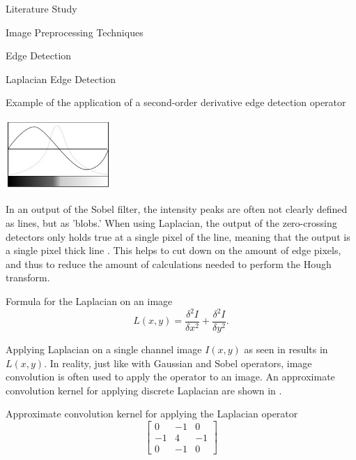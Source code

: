 \documentclass{matthijs}
\begin{document}
\begin{hoofdstuk}{Literature Study}
\begin{paragraaf}{Image Preprocessing Techniques}
\begin{subparagraaf}{Edge Detection}
\begin{subsubparagraaf}{Laplacian Edge Detection}
					\begin{figuur}{Example of the application of a second-order derivative edge detection operator}

						\includegraphics[width=0.3\textwidth]{sinha2017sobel-img3.jpg}
						\cite{sinha2017sobel}

					\end{figuur}

					In an output of the Sobel filter, the intensity peaks are often not clearly defined as lines, but as 'blobs.'
					When using Laplacian, the output of the zero-crossing detectors only holds true at a single pixel of the line, meaning that the output is a single pixel thick line \cite{alazzawi2015edge}.
					This helps to cut down on the amount of edge pixels, and thus to reduce the amount of calculations needed to perform the Hough transform.

					\begin{figuur}{Formula for the Laplacian on an image}
						\begin{equation*}
							L(x,y) = \frac{\delta^2 I}{\delta x^2} + \frac{\delta^2 I}{\delta y^2}.
						\end{equation*}

						\cite{fisher2003hypermedia}
					\end{figuur}

					Applying Laplacian on a single channel image $I(x,y)$ as seen in  results in $L(x,y)$.
					In reality, just like with Gaussian and Sobel operators, image convolution is often used to apply the operator to an image.
					An approximate convolution kernel for applying discrete Laplacian are shown in .

					\begin{figuur}{Approximate convolution kernel for applying the Laplacian operator}
						\begin{equation*}
							\begin{bmatrix}
								0 & -1 & 0 \\
								-1 & 4 & -1 \\
								0 & -1 & 0
							\end{bmatrix}
						\end{equation*}


\end{figuur}
\end{subsubparagraaf}
\end{subparagraaf}
\end{paragraaf}
\end{hoofdstuk}
\end{document}
